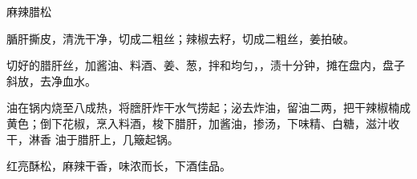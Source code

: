 \begin{recipe}{麻辣腊松}

\ingredients


\preparation

\step 腯肝撕皮，清洗干净，切成二粗丝；辣椒去籽，切成二粗丝，姜拍破。

\step 切好的腊肝丝，加酱油、料酒、姜、葱，拌和均匀，，渍十分钟，摊在盘内，盘子
斜放，去净血水。

\step 油在锅内烧至八成热，将膪肝炸干水气捞起；泌去炸油，留油二两，把干辣椒楠成
黄色；倒下花椒，烹入料酒，梭下腊肝，加酱油，掺汤，下味精、白糖，滋汁收干，淋香
油于腊肝上，几簸起锅。

\features

红亮酥松，麻辣干香，味浓而长，下酒佳品。

\end{recipe}

